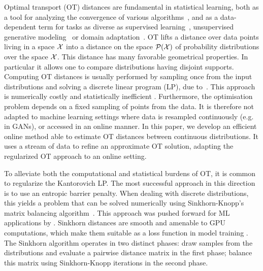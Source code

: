 
Optimal transport (OT) distances are fundamental in statistical learning, both
as a tool for analyzing the convergence of various
algorithms~\citep{canas2012learning,dalalyan2019user}, and as a data-dependent
term for tasks as diverse as supervised learning~\citep{frogner2015learning},
unsupervised generative modeling~\citep{arjovsky2017wgan} or domain
adaptation~\citep{courty2016optimal}.
%
OT lifts a distance over data points living in a space $\mathcal{X}$ into a distance
on the space $\mathcal{P}(\mathcal{X})$ of probability distributions over the space $\mathcal{X}$.
% 
%
This distance has many favorable geometrical properties. In particular it allows one to compare distributions having disjoint supports. 
% 
Computing OT distances is usually performed by sampling once from the input
distributions and solving a discrete linear program (LP), due
to~\citet{Kantorovich42}. This approach is numerically costly and statistically
inefficient \citep{weed2019sharp}. Furthermore, the optimisation problem depends on a fixed
sampling of points from the data. It is therefore not adapted to machine
learning settings where data is resampled continuously (e.g. in GANs), or
accessed in an online manner. In this paper, we develop an efficient
online method able to estimate OT distances between continuous distributions. It uses 
a stream of data to refine an approximate OT solution,
adapting the regularized OT approach to an online setting.
  


To alleviate both the computational and statistical burdens of OT, it is common
to regularize the Kantorovich LP.
%
The most successful approach in this direction is to use an entropic barrier penalty. 
%
When dealing with discrete distributions, this yields a problem that can be solved
numerically using Sinkhorn-Knopp's matrix balancing
algorithm~\citep{Sinkhorn64,sinkhorn1967concerning}.
%
This approach was pushed forward for ML applications by
\citet{cuturi2013sinkhorn}. Sinkhorn distances are smooth and amenable to GPU
computations, which make them suitable as a loss function in model training \citep{frogner2015learning, mensch_geometric_2019}.
The Sinkhorn algorithm operates in two distinct phases: draw samples from the
distributions and evaluate a pairwise distance matrix in the first phase;
balance this matrix using Sinkhorn-Knopp iterations in the second
phase.

